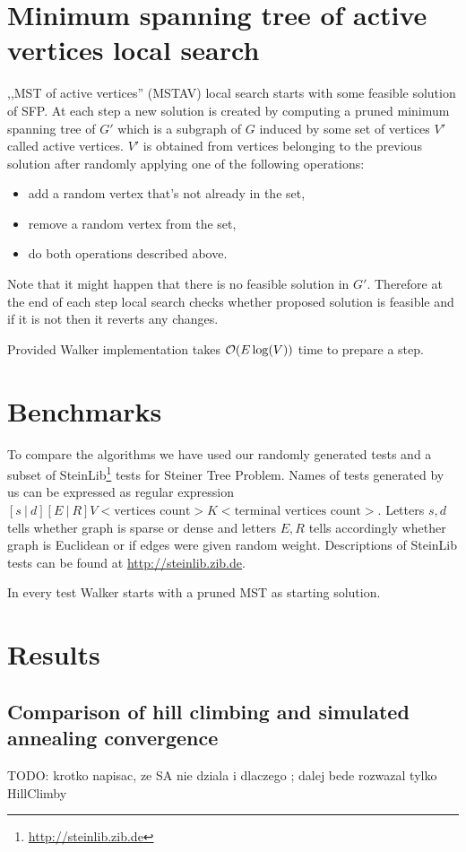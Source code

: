 \section{Minimum spanning tree of active vertices local search}
,,MST of active vertices'' (MSTAV) local search starts with some feasible solution of SFP. At each step a new solution is created by computing a pruned minimum spanning tree of $G'$ which is a subgraph of $G$ induced by some set of vertices $V'$ called active vertices. $V'$ is obtained from vertices belonging to the previous solution after randomly applying one of the following operations:
\begin{itemize}
\item add a random vertex that's not already in the set,
\item remove a random vertex from the set,
\item do both operations described above.
\end{itemize}

Note that it might happen that there is no feasible solution in $G'$. Therefore at the end of each step local search checks whether proposed solution is feasible and if it is not then it reverts any changes.

Provided Walker implementation takes $\mathcal{O}(E \log(V))$ time to prepare a step.

\section{Benchmarks}
To compare the algorithms we have used our randomly generated tests and a subset of SteinLib\footnote{\url{http://steinlib.zib.de}} tests for Steiner Tree Problem.
Names of tests generated by us can be expressed as regular expression $[s\ |\ d][E\ |\ R]V<\text{vertices count}>K<\text{terminal vertices count}>$. Letters $s, d$ tells whether graph is sparse or dense and letters $E, R$ tells accordingly whether graph is Euclidean or if edges were given random weight. Descriptions of SteinLib tests can be found at \url{http://steinlib.zib.de}.

In every test Walker starts with a pruned MST as starting solution.
\section{Results}

\subsection{Comparison of hill climbing and simulated annealing convergence}
TODO: krotko napisac, ze SA nie dziala i dlaczego ; dalej bede rozwazal tylko HillClimby

